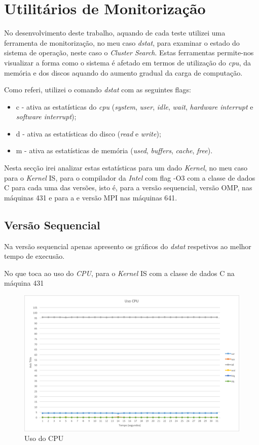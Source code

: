 \documentclass[conference,compsoc]{IEEEtran}
\begin{document}
\section{Utilitários de Monitorização}
No desenvolvimento deste trabalho, aquando de cada teste utilizei uma ferramenta de monitorização, no meu caso \textit{dstat}, para examinar o estado do sistema de operação, neste caso o \textit{Cluster Search}. Estas ferramentas permite-nos visualizar a forma como o sistema é afetado em termos de utilização do \textit{cpu}, da memória e dos discos aquando do aumento gradual da carga de computação.

Como referi, utilizei o comando \textit{dstat} com as seguintes flags:
\begin{itemize}
\item c - ativa as estatísticas do \textit{cpu} (\textit{system}, \textit{user}, \textit{idle}, \textit{wait}, \textit{hardware interrupt} e \textit{software interrupt});
\item d - ativa as estatísticas do disco (\textit{read} e \textit{write});
\item m - ativa as estatísticas de memória (\textit{used}, \textit{buffers}, \textit{cache}, \textit{free}).
\end{itemize}

Nesta secção irei analizar estas estatísticas para um dado \textit{Kernel}, no meu caso para o \textit{Kernel} IS, para o compilador da \textit{Intel} com flag -O3 com a classe de dados C para cada uma das versões, isto é, para a versão sequencial, versão OMP, nas máquinas 431 e para a e versão MPI nas máquinas 641.

\subsection{Versão Sequencial}
Na versão sequencial apenas apresento os gráficos do \textit{dstat} respetivos ao melhor tempo de execusão.

No que toca ao uso do \textit{CPU}, para o \textit{Kernel} IS com a classe de dados C na máquina 431

\begin{figure}[h!]
\centering
\includegraphics[scale=0.325]{dstat/SER/dstat_seq_cpu.png}
\caption{Uso do CPU}
\label{fig:dstat_seq_cpu}
\end{figure}
\end{document}
